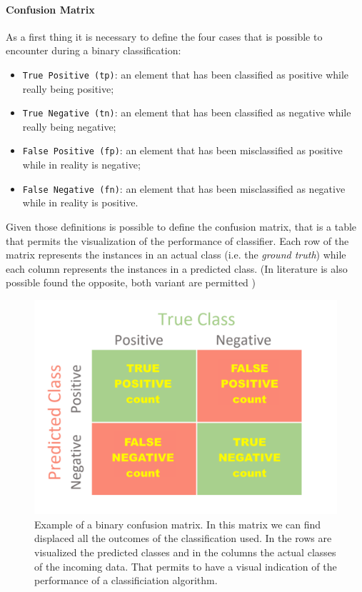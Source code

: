 \documentclass{standalone}
\begin{document}
\paragraph{Confusion Matrix}
As a first thing it is necessary to define the four cases that is possible to encounter during a binary classification:
\begin{itemize}
\label{Def:confusion_matrix}
    \item \texttt{True Positive (tp)}: an element that has been classified as positive while really being positive;
    \item \texttt{True Negative (tn)}: an element that has been classified as negative while really being negative;
    \item \texttt{False Positive (fp)}: an element that has been misclassified as positive while in reality is negative;
    \item \texttt{False Negative (fn)}: an element that has been misclassified as negative while in reality is positive.
\end{itemize} 

Given those definitions is possible to define the confusion matrix, that is a table that permits the visualization of the performance of classifier. Each row of the matrix represents the instances in an actual class (i.e. the \emph{ground truth}) while each column represents the instances in a predicted class. (In literature is also possible found the opposite, both variant are permitted \cite{ART:ConfusionMatrix1, ART:ConfusionMatrix2} )

\begin{figure}[h!]
		\centering
             \includegraphics[scale=0.3]{img/Chap1/Confusion Matrix.png}
		\caption{Example of a binary confusion matrix. In this matrix we can find displaced all the outcomes of the classification used. In the rows are visualized the predicted classes and in the columns the actual classes of the incoming data. That permits to have a visual indication of the performance of a classificiation algorithm.  }
		\label{fig:ConfusionMatrix}
\end{figure}
\end{document}
